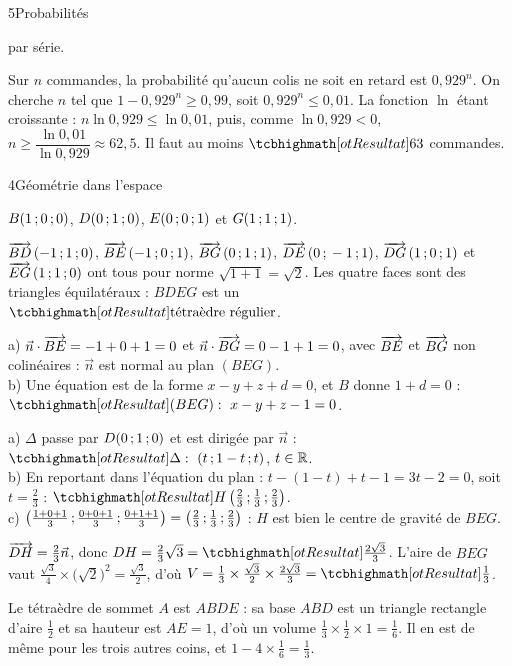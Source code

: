 \begin{corrigeBac}{5}{Probabilités}
\begin{questions}[resume]
    par série. 
\end{questions}
\begin{questions}[resume]
  \item Sur $n$ commandes, la probabilité qu'aucun colis ne soit en retard est $0{,}929^{n}$. On cherche $n$ tel que
    $1-0{,}929^{n}\geq0{,}99$, soit $0{,}929^{n}\leq0{,}01$. La fonction $\ln$ étant croissante :
    $n\ln0{,}929\leq\ln0{,}01$, puis, comme $\ln0{,}929<0$, $n\geq\dfrac{\ln0{,}01}{\ln0{,}929}\approx62{,}5$. Il faut au moins
    $\res{63}$ commandes. 
\end{questions}
\end{corrigeBac}

\begin{corrigeBac}{4}{Géométrie dans l'espace}
\begin{questions}
  \item $B(1\,{;}\,0\,{;}\,0)$, $D(0\,{;}\,1\,{;}\,0)$, $E(0\,{;}\,0\,{;}\,1)$ et $G(1\,{;}\,1\,{;}\,1)$. 
  \item $\overrightarrow{BD}\,(-1\,{;}\,1\,{;}\,0)$, $\overrightarrow{BE}\,(-1\,{;}\,0\,{;}\,1)$, $\overrightarrow{BG}\,(0\,{;}\,1\,{;}\,1)$, $\overrightarrow{DE}\,(0\,{;}\,-1\,{;}\,1)$, $\overrightarrow{DG}\,(1\,{;}\,0\,{;}\,1)$ et
    $\overrightarrow{EG}\,(1\,{;}\,1\,{;}\,0)$ ont tous pour norme $\sqrt{1+1}=\sqrt2$. Les quatre faces sont des triangles équilatéraux : $BDEG$ est un
    $\res{\text{tétraèdre régulier}}$. 
  \item a) $\vec n\cdot\overrightarrow{BE}=-1+0+1=0$ et $\vec n\cdot\overrightarrow{BG}=0-1+1=0$, avec $\overrightarrow{BE}$ et $\overrightarrow{BG}$ non colinéaires : $\vec n$
    est normal au plan $(BEG)$.\\
    b) Une équation est de la forme $x-y+z+d=0$, et $B$ donne $1+d=0$ : $\res{(BEG):\ x-y+z-1=0}$. \pts{1 pt}
  \item a) $\Delta$ passe par $D(0\,{;}\,1\,{;}\,0)$ et est dirigée par $\vec n$ : $\res{\Delta:\ (t\pv1-t\pv t)}$, $t\in\mathbb{R}$.\\
    b) En reportant dans l'équation du plan : $t-(1-t)+t-1=3t-2=0$, soit $t=\frac23$ : $\res{H\left(\tfrac23\pv\tfrac13\pv\tfrac23\right)}$.\\
    c) $\left(\frac{1+0+1}{3}\,{;}\,\frac{0+0+1}{3}\,{;}\,\frac{0+1+1}{3}\right)=\left(\frac23\,{;}\,\frac13\,{;}\,\frac23\right)$ : $H$ est bien le centre de
    gravité de $BEG$. \pts{1 pt}
  \item $\overrightarrow{DH}=\frac23\vec n$, donc $DH=\frac23\sqrt3=\res{\tfrac{2\sqrt3}{3}}$. L'aire de $BEG$ vaut $\frac{\sqrt3}{4}\times\big(\sqrt2\big)^2=\frac{\sqrt3}{2}$,
    d'où $V=\frac13\times\frac{\sqrt3}{2}\times\frac{2\sqrt3}{3}=\res{\tfrac13}$. 
  \item Le tétraèdre de sommet $A$ est $ABDE$ : sa base $ABD$ est un triangle rectangle d'aire $\frac12$ et sa hauteur est $AE=1$, d'où un
    volume $\frac13\times\frac12\times1=\frac16$. Il en est de même pour les trois autres coins, et $1-4\times\frac16=\frac13$. 
\end{questions}
\end{corrigeBac}

